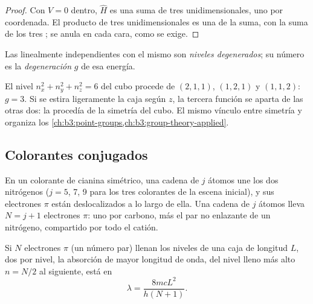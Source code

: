 \begin{proof}
Con $V = 0$ dentro, $\hat H$ es una suma de tres  unidimensionales,
uno por coordenada. El producto de tres  unidimensionales es
una  de la suma, con la suma de los tres ; se
anula en cada cara, como se exige.
\end{proof}

\begin{definition}\label{def:b3:quantum-model-systems:degenerate}
Las  linealmente independientes con el mismo  son
\emph{niveles degenerados}; su número es la
\emph{degeneración} $g$ de esa energía.
\end{definition}

\begin{example}\label{ex:b3:quantum-model-systems:cube}
El nivel $n_x^2 + n_y^2 + n_z^2 = 6$ del cubo procede de $(2,1,1)$,
$(1,2,1)$ y $(1,1,2)$: $g = 3$. Si se estira ligeramente la caja según $z$,
la tercera función se aparta de las otras dos: la  procedía de
la simetría del cubo. El mismo vínculo entre simetría y 
organiza los \cref{ch:b3:point-groups,ch:b3:group-theory-applied}.
\end{example}

\subsection*{Colorantes conjugados}

En un colorante de cianina simétrico, una cadena de $j$ átomos une los dos nitrógenos
(\(j = 5\), 7, 9 para los tres colorantes de la escena inicial), y sus electrones $\pi$
están deslocalizados a lo largo de ella. Una cadena de $j$ átomos lleva $N = j + 1$ electrones
$\pi$: uno por carbono, más el par no enlazante de un nitrógeno, compartido por
todo el catión.

\begin{proposition}\label{prop:b3:quantum-model-systems:free-electron}
Si $N$ electrones $\pi$ (un número par) llenan los niveles de una caja de longitud $L$,
dos por nivel, la absorción de mayor longitud de onda, del nivel lleno más alto
$n = N/2$ al siguiente, está en
\[
\lambda = \frac{8mcL^2}{h(N+1)}.
\]
\end{proposition}

